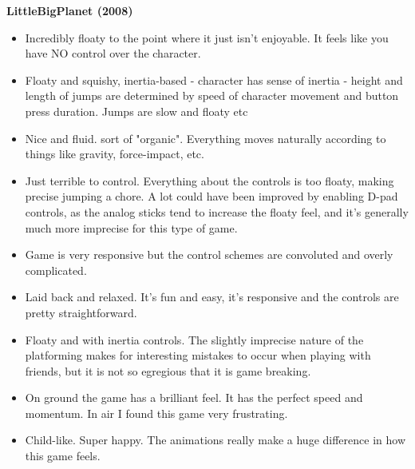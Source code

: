 \textbf{LittleBigPlanet (2008)}
\vspace{-5mm}
\begin{itemize}[noitemsep,nolistsep]
\item Incredibly floaty to the point where it just isn't enjoyable. It feels like you have NO control over the character.
\item Floaty and squishy, inertia-based - character has sense of inertia - height and length of jumps are determined by speed of character movement and button press duration. Jumps are slow and floaty etc
\item Nice and fluid. sort of "organic". Everything moves naturally according to things like gravity, force-impact, etc.
\item Just terrible to control. Everything about the controls is too floaty, making precise jumping a chore. A lot could have been improved by enabling D-pad controls, as the analog sticks tend to increase the floaty feel, and it's generally much more imprecise for this type of game.
\item Game is very responsive but the control schemes are convoluted and overly complicated. 
\item Laid back and relaxed. It's fun and easy, it's responsive and the controls are pretty straightforward.
\item Floaty and with inertia controls. The slightly imprecise nature of the platforming makes for interesting mistakes to occur when playing with friends, but it is not so egregious that it is game breaking. 
\item On ground the game has a brilliant feel. It has the perfect speed and momentum. In air I found this game very frustrating.
\item Child-like. Super happy. The animations really make a huge difference in how this game feels.
\end{itemize}

